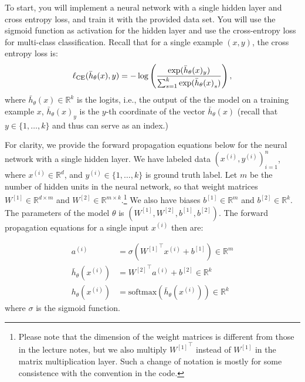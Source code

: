 To start, you will implement a neural network with a single hidden layer
and cross entropy loss, and train it with the provided data set. You will use the
sigmoid function as activation for the hidden layer and use the cross-entropy loss for multi-class classification. Recall that for a single example $(x, y)$, the cross
entropy loss is:
$$\ell_\textup{CE}(\bar{h}_{\theta}(x),y) = - \log\left(\frac{\exp(\bar{h}_{\theta}(x)_{y})}{\sum_{s=1}^{k}\exp({\bar{h}_{\theta}(x)}_s)}\right),$$
where $\bar{h}_{\theta}(x) \in \mathbb{R}^{k}$ is the logits, i.e., the output of the the model on a training example $x$, $\bar{h}_\theta(x)_y$ is the $y$-th coordinate of the vector $\bar{h}_\theta(x)$ (recall that $y\in \{1,\dots, k\}$ and thus can serve as an index.) 



For clarity, we provide the forward propagation equations below for the neural network with a single hidden layer. We have labeled data $(x^{(i)}, y^{(i)})_{i=1}^n$, where $x^{(i)} \in \mathbb{R}^d$, and $y^{(i)} \in \{1,\dots, k\}$ is ground truth label. Let $m$ be the number of hidden units in the neural network, so that weight matrices $W^{[1]} \in \mathbb{R}^{d \times m}$ and $W^{[2]} \in \mathbb{R}^{m \times k}$.\footnote{Please note that the dimension of the weight matrices is different from those in the lecture notes, but we also multiply ${W^{[1]}}^\top$ instead of $W^{[1]}$ in the matrix multiplication layer.  Such a change of notation is mostly for some consistence with the convention in the code.}  We also have biases $b^{[1]} \in \mathbb{R}^m$ and $b^{[2]} \in \mathbb{R}^k$. The parameters of the model $\theta$ is $(W^{[1]},W^{[2]},b^{[1]},b^{[2]})$. The forward propagation equations for a single input $x^{(i)}$ then are:

\begin{align*}
  a^{(i)} &= \sigma \left( {W^{[1]}}^\top x^{(i)}  + b^{[1]} \right)  \in \mathbb{R}^m \\
  \bar{h}_{\theta}(x^{(i)})&= {W^{[2]}}^\top a^{(i)} + b^{[2]} \in \mathbb{R}^k \\
  {h}_{\theta}(x^{(i)}) &=  \mathrm{softmax}(\bar{h}_{\theta}(x^{(i)})) \in \mathbb{R}^k
\end{align*}
where $\sigma$ is the sigmoid function. 

